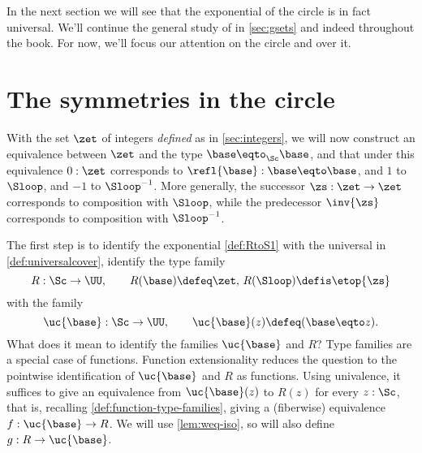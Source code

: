 In the next section we will see that the exponential \covering
of the circle is in fact universal.
We'll continue the general study of \coverings in \cref{sec:gsets}
and indeed throughout the book.
For now, we'll focus our attention on the circle and \coverings over it.

\section{The symmetries in the circle}
\label{sec:symcirc}

With the set $\zet$ of integers \emph{defined} as in \cref{sec:integers},
we will now construct an equivalence between $\zet$ and the type
$\base\eqto_{\Sc}\base$, and that under this equivalence $0:\zet$ corresponds to
$\refl{\base}:\base\eqto \base$, and $1$ to $\Sloop$, and $-1$ to $\Sloop^{-1}$.
More generally, the successor $\zs:\zet\to\zet$ corresponds to composition
with $\Sloop$, while the predecessor $\inv{\zs}$ corresponds to composition
with $\Sloop^{-1}$.

The first step is to identify the exponential \covering \cref{def:RtoS1}
with the universal \covering in \cref{def:universalcover},
\ie identify the type family
\[
  R: \Sc\to\UU,\qquad R(\base)\defeq\zet,\, R(\Sloop)\defis \etop{\zs}
\]
with the family
\[
\uc{\base}:\Sc\to\UU,\qquad \uc{\base}(z)\defeq (\base\eqto z).
\]
What does it mean to identify the families $\uc{\base}$ and $R$?
Type families are a special case of functions.
Function extensionality reduces the question to the pointwise
identification of $\uc{\base}$ and $R$ as functions.
Using univalence, it suffices to give
an equivalence from $\uc{\base}(z)$ to $R(z)$ for every $z:\Sc$,
that is, recalling \cref{def:function-type-families}, giving
a (fiberwise) equivalence $f: \uc{\base}\to R$. We will use
\cref{lem:weq-iso}, so will also define $g: R\to\uc{\base}$.

